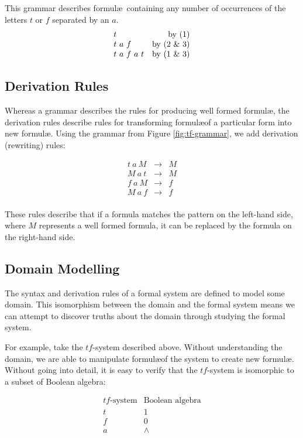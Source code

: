 This grammar describes formul\ae\ containing any number of occurrences of the letters $t$ or $f$ separated by an $a$. 
\[
\begin{array}{lr}
  t & \text{by (1)} \\
  t\ a\ f & \text{by (2 \& 3)} \\
  t\ a\ f\ a\ t & \text{by (1 \& 3)}
\end{array}
\]

\subsection{Derivation Rules}
Whereas a grammar describes the rules for producing well formed formul\ae,
the derivation rules describe rules for transforming formul\ae of a particular form into new formul\ae. 
Using the grammar from Figure \ref{fig:tf-grammar}, we add derivation (rewriting) rules:

\[
\begin{array}{lcl}
  t\ a\ M &\to& M \\ 
  M\ a\ t &\to& M \\
  f\ a\ M &\to& f \\
  M\ a\ f &\to& f \\
\end{array}
\]

These rules describe that if a formula matches the pattern on the 
left-hand side, where $M$ represents a well formed formula, it can be
replaced by the formula on the right-hand side.

\subsection{Domain Modelling}

The syntax and derivation rules of a formal system are defined to model 
some domain. This isomorphism between the domain and the formal system
means we can attempt to discover truths about the domain through studying
the formal system.

For example, take the $tf$-system described above. 
Without understanding the domain, we are able to manipulate formul\ae of the system to create new formul\ae. 
Without going into detail, it is easy to verify that the $tf$-system is isomorphic to a subset of Boolean algebra:

\[
\begin{array}{cc}
\text{$tf$-system} & \text{Boolean algebra} \\
t & 1 \\
f & 0 \\
a & \wedge \\
\end{array}
\]

